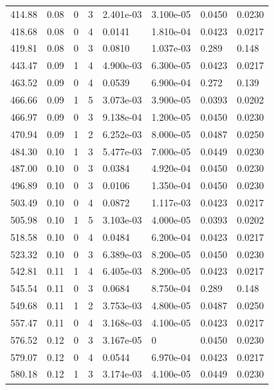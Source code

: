 \documentclass[preview]{standalone}
\begin{document}
{{{\begin{tabular}{L{1.2cm}C{1.2cm} C{0.3cm}C{0.5cm} C{1.4cm}C{1.4cm} C{1.4cm}C{1.4cm}}
  414.88  &  0.08  & 0     &  3 &  2.401e-03  & 3.100e-05  & 0.0450 &  0.0230   \\ 
  418.68  &  0.08  & 0     &  4 &  0.0141  & 1.810e-04  & 0.0423 &  0.0217   \\ 
  419.81  &  0.08  & 0     &  3 &  0.0810  & 1.037e-03  & 0.289 &  0.148   \\ 
  443.47  &  0.09  & 1     &  4 &  4.900e-03  & 6.300e-05  & 0.0423 &  0.0217   \\ 
  463.52  &  0.09  & 0     &  4 &  0.0539  & 6.900e-04  & 0.272 &  0.139   \\ 
  466.66  &  0.09  & 1     &  5 &  3.073e-03  & 3.900e-05  & 0.0393 &  0.0202   \\ 
  466.97  &  0.09  & 0     &  3 &  9.138e-04  & 1.200e-05  & 0.0450 &  0.0230   \\ 
  470.94  &  0.09  & 1     &  2 &  6.252e-03  & 8.000e-05  & 0.0487 &  0.0250   \\ 
  484.30  &  0.10  & 1     &  3 &  5.477e-03  & 7.000e-05  & 0.0449 &  0.0230   \\ 
  487.00  &  0.10  & 0     &  3 &  0.0384  & 4.920e-04  & 0.0450 &  0.0230   \\ 
  496.89  &  0.10  & 0     &  3 &  0.0106  & 1.350e-04  & 0.0450 &  0.0230   \\ 
  503.49  &  0.10  & 0     &  4 &  0.0872  & 1.117e-03  & 0.0423 &  0.0217   \\ 
  505.98  &  0.10  & 1     &  5 &  3.103e-03  & 4.000e-05  & 0.0393 &  0.0202   \\ 
  518.58  &  0.10  & 0     &  4 &  0.0484  & 6.200e-04  & 0.0423 &  0.0217   \\ 
  523.32  &  0.10  & 0     &  3 &  6.389e-03  & 8.200e-05  & 0.0450 &  0.0230   \\ 
  542.81  &  0.11  & 1     &  4 &  6.405e-03  & 8.200e-05  & 0.0423 &  0.0217   \\ 
  545.54  &  0.11  & 0     &  3 &  0.0684  & 8.750e-04  & 0.289 &  0.148   \\ 
  549.68  &  0.11  & 1     &  2 &  3.753e-03  & 4.800e-05  & 0.0487 &  0.0250   \\ 
  557.47  &  0.11  & 0     &  4 &  3.168e-03  & 4.100e-05  & 0.0423 &  0.0217   \\ 
  576.52  &  0.12  & 0     &  3 &  3.167e-05  & 0  & 0.0450 &  0.0230   \\ 
  579.07  &  0.12  & 0     &  4 &  0.0544  & 6.970e-04  & 0.0423 &  0.0217   \\ 
  580.18  &  0.12  & 1     &  3 &  3.174e-03  & 4.100e-05  & 0.0449 &  0.0230   \\ 

\end{tabular}}}}
\end{document}
